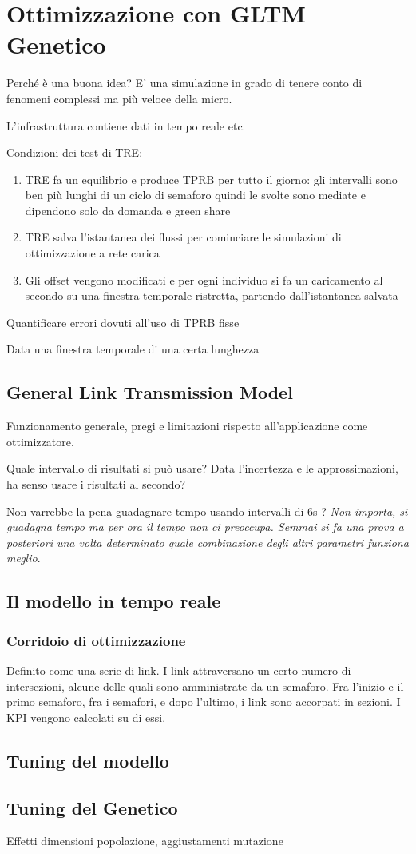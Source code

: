 \chapter{Ottimizzazione con GLTM Genetico}
Perché è una buona idea?
E' una simulazione in grado di tenere conto di fenomeni complessi ma più veloce della micro.

L'infrastruttura contiene dati in tempo reale etc.

Condizioni dei test di TRE:
\begin{enumerate}
\item TRE fa un equilibrio e produce TPRB per tutto il giorno: gli intervalli sono ben più lunghi di un ciclo di semaforo quindi le svolte sono mediate e dipendono solo da domanda e green share
\item TRE salva l'istantanea dei flussi per cominciare le simulazioni di ottimizzazione a rete carica
\item Gli offset vengono modificati e per ogni individuo si fa un caricamento al secondo su una finestra temporale ristretta, partendo dall'istantanea salvata
\end{enumerate}


Quantificare errori dovuti all'uso di TPRB fisse 

Data una finestra temporale di una certa lunghezza

\section{General Link Transmission Model}
Funzionamento generale, pregi e limitazioni rispetto all'applicazione come ottimizzatore.

Quale intervallo di risultati si può usare? Data l'incertezza e le approssimazioni, ha senso usare i risultati al secondo?

Non varrebbe la pena guadagnare tempo usando intervalli di 6s ?
\emph{Non importa, si guadagna tempo ma per ora il tempo non ci preoccupa. Semmai si fa una prova a posteriori una volta determinato quale combinazione degli altri parametri funziona meglio}.


\section{Il modello in tempo reale}

\subsection{Corridoio di ottimizzazione}
Definito come una serie di link.
I link attraversano un certo numero di intersezioni, alcune delle quali sono amministrate da un semaforo.
Fra l'inizio e il primo semaforo, fra i semafori, e dopo l'ultimo, i link sono accorpati in sezioni. I KPI vengono calcolati su di essi.

\section{Tuning del modello}


\section{Tuning del Genetico}
Effetti dimensioni popolazione, aggiustamenti mutazione